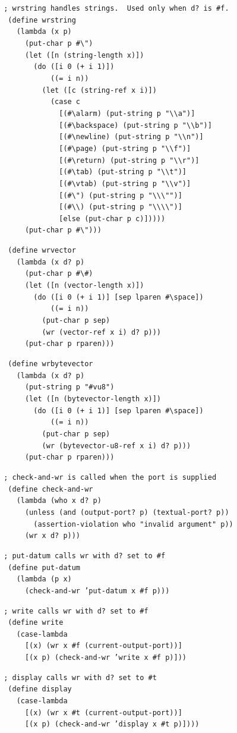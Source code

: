 \begin{alltt}
 ; wrstring handles strings.  Used only when d? is \#{}f.
  (define wrstring
    (lambda (x p)
      (put-char p \#{}\textbackslash{}")
      (let ([n (string-length x)])
        (do ([i 0 (+ i 1)])
            ((= i n))
          (let ([c (string-ref x i)])
            (case c
              [(\#{}\textbackslash{}alarm) (put-string p "\textbackslash{}\textbackslash{}a")]
              [(\#{}\textbackslash{}backspace) (put-string p "\textbackslash{}\textbackslash{}b")]
              [(\#{}\textbackslash{}newline) (put-string p "\textbackslash{}\textbackslash{}n")]
              [(\#{}\textbackslash{}page) (put-string p "\textbackslash{}\textbackslash{}f")]
              [(\#{}\textbackslash{}return) (put-string p "\textbackslash{}\textbackslash{}r")]
              [(\#{}\textbackslash{}tab) (put-string p "\textbackslash{}\textbackslash{}t")]
              [(\#{}\textbackslash{}vtab) (put-string p "\textbackslash{}\textbackslash{}v")]
              [(\#{}\textbackslash{}") (put-string p "\textbackslash{}\textbackslash{}\textbackslash{}"")]
              [(\#{}\textbackslash{}\textbackslash{}) (put-string p "\textbackslash{}\textbackslash{}\textbackslash{}\textbackslash{}")]
              [else (put-char p c)]))))
      (put-char p \#{}\textbackslash{}")))

  (define wrvector
    (lambda (x d? p)
      (put-char p \#{}\textbackslash{}\#{})
      (let ([n (vector-length x)])
        (do ([i 0 (+ i 1)] [sep lparen \#{}\textbackslash{}space])
            ((= i n))
          (put-char p sep)
          (wr (vector-ref x i) d? p)))
      (put-char p rparen)))

  (define wrbytevector
    (lambda (x d? p)
      (put-string p "\#{}vu8")
      (let ([n (bytevector-length x)])
        (do ([i 0 (+ i 1)] [sep lparen \#{}\textbackslash{}space])
            ((= i n))
          (put-char p sep)
          (wr (bytevector-u8-ref x i) d? p)))
      (put-char p rparen)))

 ; check-and-wr is called when the port is supplied
  (define check-and-wr
    (lambda (who x d? p)
      (unless (and (output-port? p) (textual-port? p))
        (assertion-violation who "invalid argument" p))
      (wr x d? p)))

 ; put-datum calls wr with d? set to \#{}f
  (define put-datum
    (lambda (p x)
      (check-and-wr 'put-datum x \#{}f p)))

 ; write calls wr with d? set to \#{}f
  (define write
    (case-lambda
      [(x) (wr x \#{}f (current-output-port))]
      [(x p) (check-and-wr 'write x \#{}f p)]))

 ; display calls wr with d? set to \#{}t
  (define display
    (case-lambda
      [(x) (wr x \#{}t (current-output-port))]
      [(x p) (check-and-wr 'display x \#{}t p)])))
\end{alltt}

